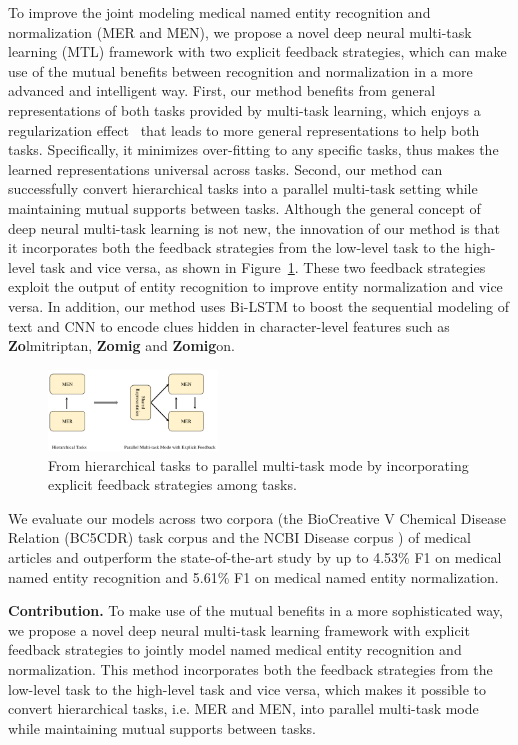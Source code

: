 To improve the joint modeling medical named entity recognition and normalization (MER and MEN), we propose a novel deep neural multi-task learning (MTL) framework with two explicit feedback strategies, which can make use of the mutual benefits between recognition and normalization in a more advanced and intelligent way. First, our method benefits from general representations of both tasks provided by multi-task learning, which enjoys a regularization effect~\cite{Collobert2011,DBLP:journals/corr/Ruder17a} that leads to more general representations to help both tasks. Specifically, it minimizes over-fitting to any specific tasks, thus makes the learned representations universal across tasks. Second, our method can successfully convert hierarchical tasks into a parallel multi-task setting while maintaining mutual supports between tasks. Although the general concept of deep neural multi-task learning is not new, the innovation of our method is that it incorporates both the feedback strategies from the low-level task to the high-level task and vice versa, as shown in Figure~\ref{fig: trans}. 
These two feedback strategies exploit the output of entity recognition to improve entity normalization and vice versa. In addition, our method uses Bi-LSTM to boost the sequential modeling of text and CNN to encode clues hidden in character-level features such as \textbf{Zo}lmitriptan, \textbf{Zomig} and \textbf{Zomig}on.
\begin{figure}[tp]
	\centering
	\includegraphics[width=0.4\textwidth]{fig/tranformation}
	\vspace{-0.1in}
	\caption{From hierarchical tasks to parallel multi-task mode by incorporating explicit feedback strategies among tasks. %
		}\label{fig: trans}
	\vspace{-0.15in}
\end{figure}

We evaluate our models across two corpora (the BioCreative V Chemical Disease Relation (BC5CDR) task corpus \cite{Li2016BioCreative} and the NCBI Disease corpus \cite{Rezarta2014NCBI}) of medical articles and outperform the state-of-the-art study by up to 4.53\% F1 on medical named entity recognition and 5.61\% F1 on medical named entity normalization.



\noindent\textbf{Contribution.}
To make use of the mutual benefits in a more sophisticated way, we propose a novel deep neural multi-task learning framework with explicit feedback strategies to jointly model named medical entity recognition and normalization. This method incorporates both the feedback strategies from the low-level task to the high-level task and vice versa, which makes it possible to convert hierarchical tasks, i.e. MER and MEN, into parallel multi-task mode while maintaining mutual supports between tasks.
